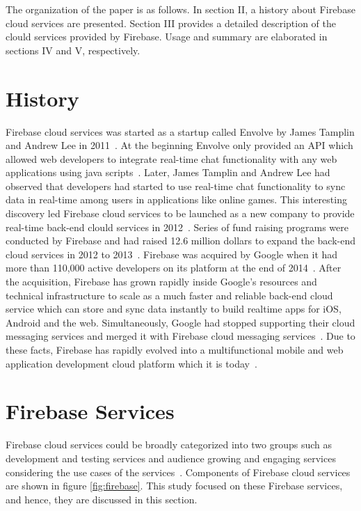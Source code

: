 The organization of the paper is as follows. In section II, a history about 
Firebase cloud services are presented. Section III provides a detailed 
description of the clould services provided by Firebase. Usage and summary are 
elaborated in sections IV and V, respectively.

\section{History}

Firebase cloud services was started as a startup called Envolve by James 
Tamplin and Andrew Lee in 2011~\cite{hid-sp18-409-www-firebase-wikipedia}. At 
the beginning Envolve only provided an API which allowed web developers to 
integrate real-time chat functionality with any web applications using java 
scripts~\cite{hid-sp18-409-www-firebase}. Later, James Tamplin and Andrew Lee 
had observed that developers had started to use real-time chat functionality to 
sync data in real-time among users in applications like online games. This 
interesting discovery led Firebase cloud services to be launched as a new 
company to provide real-time back-end clould services in 
2012~\cite{hid-sp18-409-www-firebase-wikipedia}. Series of fund raising 
programs were conducted by Firebase and had raised 12.6 million dollars to 
expand the back-end cloud services in 2012 to 
2013~\cite{hid-sp18-409-www-firebase}. Firebase was acquired by Google when it 
had more than 110,000 active developers on its platform  at the end of 
2014~\cite{hid-sp18-409-www-firebase-acquired}. After the acquisition, Firebase 
has grown rapidly inside Google's resources and technical infrastructure to 
scale as a much faster and reliable back-end cloud service which can store and 
sync data instantly to build realtime apps for iOS, Android and the web. 
Simultaneously, Google had stopped supporting their cloud messaging services 
and merged it with Firebase cloud messaging 
services~\cite{hid-sp18-409-www-firebase-merged}. Due to these facts, Firebase 
has rapidly evolved into a multifunctional mobile and web application 
development cloud platform which it is 
today~\cite{hid-sp18-409-www-firebase-official}.

\section{Firebase Services}

Firebase cloud services could be broadly categorized into two groups such as 
development and testing services and audience growing and engaging services 
considering the use cases of the 
services~\cite{hid-sp18-409-www-firebase-products}. Components of Firebase 
cloud services are shown in figure \ref{fig:firebase}. This study focused on 
these Firebase services, and hence, they are discussed in this section. 

